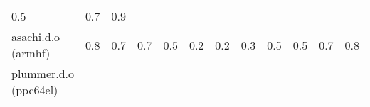\documentclass[parskip=half]{scrartcl}
\begin{document}
\begin{table}[h]
\begin{tabular}{@{}llllllllllll@{}}
\begin{minipage}[t]{0.05\columnwidth}
0.5\strut
\end{minipage} & \begin{minipage}[t]{0.05\columnwidth}\raggedright\strut
0.7\strut
\end{minipage} & \begin{minipage}[t]{0.05\columnwidth}\raggedright\strut
0.9\strut
\end{minipage}\tabularnewline
\begin{minipage}[t]{0.12\columnwidth}\raggedright\strut
asachi.d.o (armhf)\strut
\end{minipage} & \begin{minipage}[t]{0.05\columnwidth}\raggedright\strut
0.8\strut
\end{minipage} & \begin{minipage}[t]{0.05\columnwidth}\raggedright\strut
0.7\strut
\end{minipage} & \begin{minipage}[t]{0.05\columnwidth}\raggedright\strut
0.7\strut
\end{minipage} & \begin{minipage}[t]{0.05\columnwidth}\raggedright\strut
0.5\strut
\end{minipage} & \begin{minipage}[t]{0.05\columnwidth}\raggedright\strut
0.2\strut
\end{minipage} & \begin{minipage}[t]{0.05\columnwidth}\raggedright\strut
0.2\strut
\end{minipage} & \begin{minipage}[t]{0.05\columnwidth}\raggedright\strut
0.3\strut
\end{minipage} & \begin{minipage}[t]{0.05\columnwidth}\raggedright\strut
0.5\strut
\end{minipage} & \begin{minipage}[t]{0.05\columnwidth}\raggedright\strut
0.5\strut
\end{minipage} & \begin{minipage}[t]{0.05\columnwidth}\raggedright\strut
0.7\strut
\end{minipage} & \begin{minipage}[t]{0.05\columnwidth}\raggedright\strut
0.8\strut
\end{minipage}\tabularnewline
\begin{minipage}[t]{0.12\columnwidth}\raggedright\strut
plummer.d.o (ppc64el)\strut
\end{minipage} & \begin{minipage}[t]{0.05\columnwidth}\raggedright\strut

\end{minipage}
\end{tabular}
\end{table}
\end{document}
